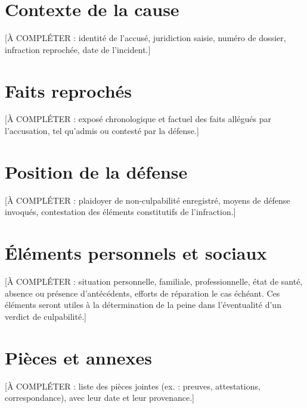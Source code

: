 %
%

\section*{Contexte de la cause}

[À COMPLÉTER : identité de l'accusé, juridiction saisie, numéro de dossier,
infraction reprochée, date de l'incident.]

\section*{Faits reprochés}

[À COMPLÉTER : exposé chronologique et factuel des faits allégués par
l'accusation, tel qu'admis ou contesté par la défense.]

\section*{Position de la défense}

[À COMPLÉTER : plaidoyer de non-culpabilité enregistré, moyens de défense
invoqués, contestation des éléments constitutifs de l'infraction.]

\section*{Éléments personnels et sociaux}

[À COMPLÉTER : situation personnelle, familiale, professionnelle, état de
santé, absence ou présence d'antécédents, efforts de réparation le cas
échéant. Ces éléments seront utiles à la détermination de la peine dans
l'éventualité d'un verdict de culpabilité.]

\section*{Pièces et annexes}

[À COMPLÉTER : liste des pièces jointes (ex. : preuves, attestations,
correspondance), avec leur date et leur provenance.]
